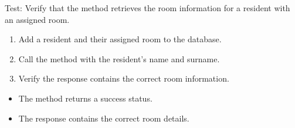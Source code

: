 \documentclass[letterpaper,10pt,english]{sphinxmanual}
\begin{document}
\begin{fulllineitems}
\label{\detokenize{test:test.test_residetnt.test_get_resident_room_success}}
\pysigstartsignatures
\pysiglinewithargsret
{}
{}
{}
\pysigstopsignatures
\sphinxAtStartPar
Test: Verify that the method retrieves the room information for a resident with an assigned room.
\begin{description}
\begin{enumerate}
%
\item {} 
\sphinxAtStartPar
Add a resident and their assigned room to the database.

\item {} 
\sphinxAtStartPar
Call the  method with the resident’s name and surname.

\item {} 
\sphinxAtStartPar
Verify the response contains the correct room information.

\end{enumerate}

\begin{itemize}
\item {} 
\sphinxAtStartPar
The method returns a success status.

\item {} 
\sphinxAtStartPar
The response contains the correct room details.

\end{itemize}

\end{description}

\end{fulllineitems}

\end{document}
